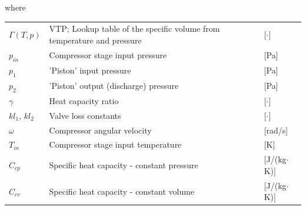 where

\begin{center}
	\begin{tabular}{l p{8cm} l}
		$\Gamma(T,p)$   & VTP; Lookup table of the specific volume from temperature and pressure & [$\cdot$]                         \\
		$p_{in}$        & Compressor stage input pressure                                        & [\si{Pa}]                         \\
		$p_1$           & 'Piston' input pressure                                                & [\si{Pa}]                         \\
		$p_2$           & 'Piston' output (discharge) pressure                                   & [\si{Pa}]                         \\
		$\gamma$        & Heat capacity ratio                                                    & [$ \cdot $]                       \\
		$ kl_1$, $kl_2$ & Valve loss constants                                                   & [$ \cdot $]                       \\
		$\omega$        & Compressor angular velocity                                            & [\si{rad}/\si{s}]                 \\
		$T_{in}$        & Compressor stage input temperature                                     & [\si{K}]                          \\
		$C_{cp}$        & Specific heat capacity - constant pressure                             & [\si{J}/(\si{kg}$ \cdot $\si{K})] \\
		$C_{cv} $       & Specific heat capacity - constant volume                               & [\si{J}/(\si{kg}$ \cdot $\si{K})]
	\end{tabular}
\end{center}


